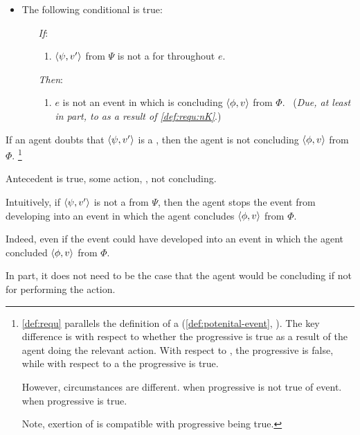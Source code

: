\begin{note}
\begin{definition}[A \requ{0}]
    \begin{itemize}
    \item
      The following conditional is true:
      \begin{itemize}
      \item[\emph{If}:]
        \begin{enumerate}[label=\alph*., ref=(\alph*), series=requDefSeries]
        \item
          \label{def:requ:nK}
          \(\langle \psi, v' \rangle\) from \(\Psi\) is not a \fc{} for \vAgent{} throughout \(e\).
        \end{enumerate}
      \item[\emph{Then}:]
        \begin{enumerate}[label=\alph*., ref=(\alph*), resume*=requDefSeries]
        \item
          \label{def:requ:nC}
          \(e\) is not an event in which \vAgent{} is concluding \(\langle \phi, v \rangle\) from \(\Phi\).\newline
          \mbox{ }\hfill(\emph{Due, at least in part, to \ninf{} as a result of \ref{def:requ:nK}}.)
        \end{enumerate}
      \end{itemize}
    \end{itemize}
    \vspace{-\baselineskip}
  \end{definition}
\end{note}

\begin{note}
  If an agent doubts that \(\langle \psi, v' \rangle\) is a \fc{}, then the agent is not concluding \(\langle \phi, v \rangle\) from \(\Phi\).%
  \footnote{
    \autoref{def:requ} parallels the definition of a \pevent{} (\autoref{def:potenital-event}, ).
    The key difference is with respect to whether the progressive is true as a result of the agent doing the relevant action.
    With respect to \ninf{}, the progressive is false, while with respect to a  the progressive is true.

    However, circumstances are different.
    \pevent{} when progressive is not true of event.
    \ninf{} when progressive is true.

    Note, exertion of \ninf{} is compatible with progressive being true.
  }

  Antecedent is true, some action, \ninf{}, not concluding.

  Intuitively, if \(\langle \psi, v' \rangle\) is not a \fc{} from \(\Psi\), then the agent stops the event from developing into an event in which the agent concludes \(\langle \phi, v \rangle\) from \(\Phi\).

  Indeed, even if the event could have developed into an event in which the agent concluded \(\langle \phi, v \rangle\) from \(\Phi\).

  In part, it does not need to be the case that the agent would be concluding if not for performing the action.
\end{note}

